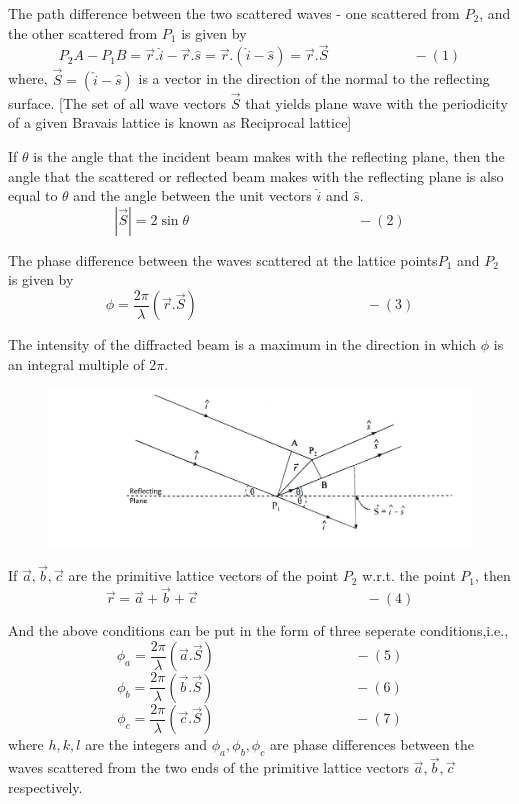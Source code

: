 \documentclass[12pt]{article}
\begin{document}
The path difference between the two scattered waves - one scattered from $P_2$, and the other scattered from $P_1$ is given by
$$ P_2A - P_1B = \vec{r}.\hat{i} - \vec{r}.\hat{s} = \vec{r}.(\hat{i}-\hat{s}) = \vec{r}.\vec{S}                              \qquad\qquad\qquad -(1)$$
where, $\vec{S} = (\hat{i}-\hat{s})$ is a vector in the direction of the normal to the reflecting surface.
[The set of all wave vectors $\vec{S}$ that yields plane wave with the periodicity of a given Bravais lattice is known as Reciprocal lattice]

If $\theta$ is the angle that the incident beam makes with the reflecting plane, then the angle that the scattered or reflected beam makes with the reflecting plane is also equal to $\theta$ and the angle between the unit vectors $\hat{i}$ and $\hat{s}$.
$$ |\vec{S}| = 2\sin \theta                 \qquad\qquad\qquad\qquad\qquad\qquad -(2)$$

The phase difference between the waves scattered at the lattice points$P_1$ and $P_2$ is given by $$ \phi = \frac{2\pi}{\lambda} (\vec{r}.\vec{S}) \qquad\qquad\qquad\qquad\qquad\qquad -(3)$$

The intensity of the diffracted beam is a maximum in the direction in which $\phi$ is an integral multiple of $2\pi$.

\begin{figure}[h!]
  \centering \includegraphics[width= 18cm] {la.jpg}
\end{figure}

If $\vec{a},\vec{b},\vec{c}$ are the primitive lattice vectors of the point $P_2$ w.r.t. the point $P_1$, then $$\vec{r}=\vec{a}+\vec{b}+\vec{c} \qquad\qquad\qquad\qquad\qquad\qquad -(4)$$

And the above conditions can be put in the form of three seperate conditions,i.e.,
$$ \phi_a = \frac{2\pi}{\lambda} (\vec{a}.\vec{S}) \qquad\qquad\qquad\qquad\qquad -(5)$$
$$ \phi_b = \frac{2\pi}{\lambda} (\vec{b}.\vec{S}) \qquad\qquad\qquad\qquad\qquad -(6)$$
$$ \phi_c = \frac{2\pi}{\lambda} (\vec{c}.\vec{S}) \qquad\qquad\qquad\qquad\qquad -(7)$$
where $h,k,l$ are the integers and $\phi_a,\phi_b,\phi_c$ are phase differences between the waves scattered from the two ends of the primitive lattice vectors $\vec{a},\vec{b},\vec{c}$ respectively.
\end{document}

